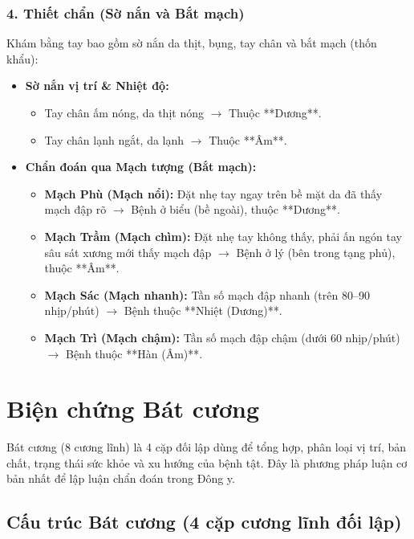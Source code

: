 \subsubsection{4. Thiết chẩn (Sờ nắn và Bắt mạch)}
Khám bằng tay bao gồm sờ nắn da thịt, bụng, tay chân và bắt mạch (thốn khẩu):

\begin{itemize}
    \item \textbf{Sờ nắn vị trí \& Nhiệt độ:}
    \begin{itemize}
        \item Tay chân ấm nóng, da thịt nóng $\rightarrow$ Thuộc **Dương**.
        \item Tay chân lạnh ngắt, da lạnh $\rightarrow$ Thuộc **Âm**.
    \end{itemize}

    \item \textbf{Chẩn đoán qua Mạch tượng (Bắt mạch):}
    \begin{itemize}
        \item \textbf{Mạch Phù (Mạch nổi):} Đặt nhẹ tay ngay trên bề mặt da đã thấy mạch đập rõ $\rightarrow$ Bệnh ở biểu (bề ngoài), thuộc **Dương**.
        \item \textbf{Mạch Trầm (Mạch chìm):} Đặt nhẹ tay không thấy, phải ấn ngón tay sâu sát xương mới thấy mạch đập $\rightarrow$ Bệnh ở lý (bên trong tạng phủ), thuộc **Âm**.
        \item \textbf{Mạch Sác (Mạch nhanh):} Tần số mạch đập nhanh (trên 80--90 nhịp/phút) $\rightarrow$ Bệnh thuộc **Nhiệt (Dương)**.
        \item \textbf{Mạch Trì (Mạch chậm):} Tần số mạch đập chậm (dưới 60 nhịp/phút) $\rightarrow$ Bệnh thuộc **Hàn (Âm)**.
    \end{itemize}
\end{itemize}

\section{Biện chứng Bát cương}

Bát cương (8 cương lĩnh) là 4 cặp đối lập dùng để tổng hợp, phân loại vị trí, bản chất, trạng thái sức khỏe và xu hướng của bệnh tật. Đây là phương pháp luận cơ bản nhất để lập luận chẩn đoán trong Đông y.

\subsection{Cấu trúc Bát cương (4 cặp cương lĩnh đối lập)}

